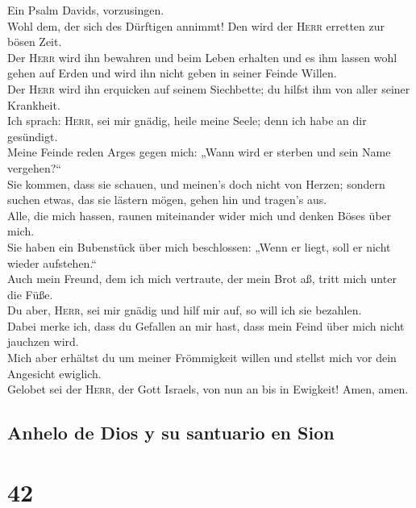  Ein Psalm Davids, vorzusingen.\\
 Wohl dem, der sich des Dürftigen annimmt! Den wird der
\textsc{Herr} erretten zur bösen Zeit.\\
 Der \textsc{Herr} wird ihn bewahren und beim Leben
erhalten und es ihm lassen wohl gehen auf Erden und wird ihn nicht geben
in seiner Feinde Willen.\\
 Der \textsc{Herr} wird ihn erquicken auf seinem
Siechbette; du hilfst ihm von aller seiner Krankheit.\\
 Ich sprach: \textsc{Herr}, sei mir gnädig, heile meine
Seele; denn ich habe an dir gesündigt.\\
 Meine Feinde reden Arges gegen mich: „Wann wird er
sterben und sein Name vergehen?{}``\\
 Sie kommen, dass sie schauen, und meinen's doch nicht von
Herzen; sondern suchen etwas, das sie lästern mögen, gehen hin und
tragen's aus.\\
 Alle, die mich hassen, raunen miteinander wider mich und
denken Böses über mich.\\
 Sie haben ein Bubenstück über mich beschlossen: „Wenn er
liegt, soll er nicht wieder aufstehen.``\\
 Auch mein Freund, dem ich mich vertraute, der mein Brot
aß, tritt mich unter die Füße.\\
 Du aber, \textsc{Herr}, sei mir gnädig und hilf mir auf,
so will ich sie bezahlen.\\
 Dabei merke ich, dass du Gefallen an mir hast, dass mein
Feind über mich nicht jauchzen wird.\\
 Mich aber erhältst du um meiner Frömmigkeit willen und
stellst mich vor dein Angesicht ewiglich.\\
 Gelobet sei der \textsc{Herr}, der Gott Israels, von nun
an bis in Ewigkeit! Amen, amen.

\hypertarget{anhelo-de-dios-y-su-santuario-en-sion}{%
\subsection{Anhelo de Dios y su santuario en
Sion}\label{anhelo-de-dios-y-su-santuario-en-sion}}

\hypertarget{section-41}{%
\section{42}\label{section-41}}

